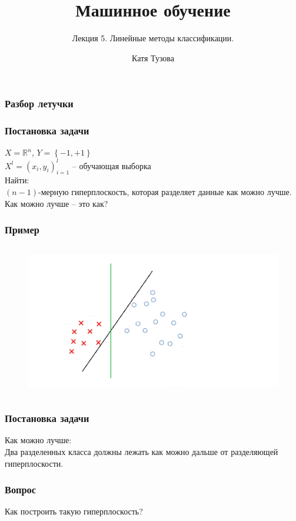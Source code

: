 \documentclass[12pt]{beamer}
\author{Катя Тузова}
\title{Машинное обучение}
\subtitle{Лекция 5. Линейные методы классификации.}
\date{}
\begin{document}
	
\frame{\titlepage}

\begin{frame}\frametitle{Разбор летучки}
\end{frame}


\begin{frame}\frametitle{Постановка задачи}
$X = \mathbb{R}^n$, ${Y = \left\{ -1, + 1\right\}}$\\
${X^l = (x_i, y_i)_{i = 1}^l}$ -- обучающая выборка\\
\vspace{5mm}Найти:\\
$(n-1)$-мерную гиперплоскость, которая разделяет данные как можно лучше.
\\ \vspace{5mm}
Как можно лучше -- это как?

\end{frame}

\begin{frame}\frametitle{Пример}
\begin{figure}[htbp]
  \includegraphics[height=190pt, keepaspectratio = true]{images/example}   
\end{figure}
\end{frame}

\begin{frame}\frametitle{Постановка задачи}
Как можно лучше:\\
Два разделенных класса должны лежать как можно дальше от разделяющей гиперплоскости.\\
\end{frame}

\begin{frame}\frametitle{Вопрос}
Как построить такую гиперплоскость?
\end{frame}
\end{document}
